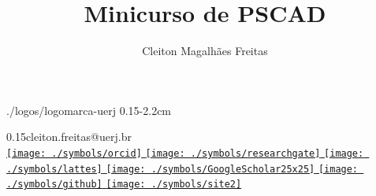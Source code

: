 \documentclass[12pt,aspectratio=169]{beamer}
\author[Cleiton Magalhães Freitas]{Cleiton Magalhães Freitas}
\title[Minicurso de PSCAD]
{Minicurso de PSCAD}
\date{}
\newcommand{\cmfnetwork}{
\href{https://orcid.org/0000-0002-6300-0521}
{
\texttt{[image: ./symbols/orcid]}
}\href{https://www.researchgate.net/profile/Cleiton_Freitas}
{
\texttt{[image: ./symbols/researchgate]}
}\href{http://lattes.cnpq.br/8580465355265899}
{
\texttt{[image: ./symbols/lattes]}
}\href{https://scholar.google.com/citations?user=Nq_YDvIAAAAJ&hl=pt-BR}
{
\texttt{[image: ./symbols/GoogleScholar25x25]}
}\href{https://www.mendeley.com/profiles/cleiton-freitas3/}
{
\texttt{[image: ./symbols/github]}
}\href{http://www.eng.uerj.br/prof/cleitoncmf}
{
\texttt{[image: ./symbols/site2]}
}
}
\begin{document}
\renewcommand{\inserttotalframenumber}{\pageref{lastframe}} %

					{./logos/logomarca-uerj}				                    {0.15\linewidth}{-2.2cm}
					
				                    {0.15\linewidth}{cleiton.freitas@uerj.br}{\\[5pt] \cmfnetwork}

\cmftableofcontents

%








%
%
%
%
%
%
%
%
%
%
%
%
%
%
%


%
%
%
%
\end{document}
